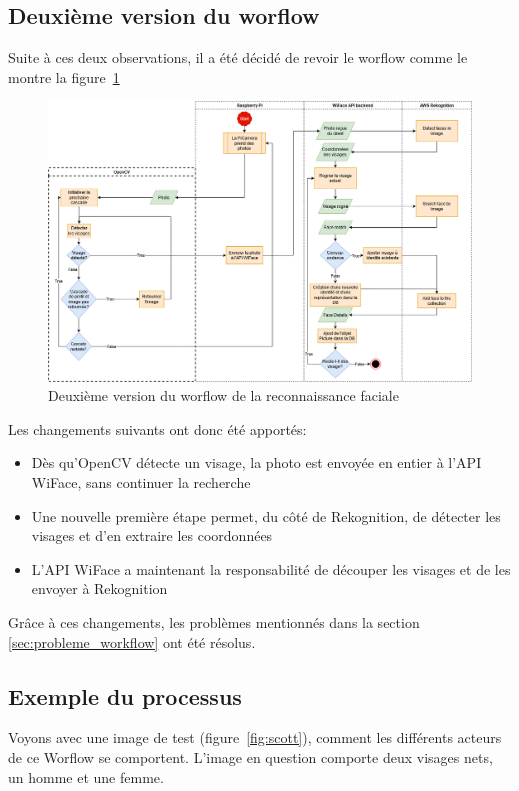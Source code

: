 \subsection{Deuxième version du worflow}
Suite à ces deux observations, il a été décidé de revoir le worflow comme le montre la figure~\ref{fig:worflow-reco2}

\clearpage
\newpage

\thispagestyle{empty}
\begin{landscape}
    \centering
\thispagestyle{empty}
\begin{figure}%
     \includegraphics[width=\linewidth]{images/facial_reco/flowchart_reco_v3.png}
     \caption{Deuxième version du worflow de la reconnaissance faciale}
     \label{fig:worflow-reco2}
\end{figure}
\end{landscape}

Les changements suivants ont donc été apportés:
\begin{itemize}
    \item Dès qu'OpenCV détecte un visage, la photo est envoyée en entier à l'API WiFace, sans continuer la recherche
    \item Une nouvelle première étape permet, du côté de Rekognition, de détecter les visages et d'en extraire les coordonnées
    \item L'API WiFace a maintenant la responsabilité de découper les visages et de les envoyer à Rekognition
\end{itemize}

Grâce à ces changements, les problèmes mentionnés dans la section \ref{sec:probleme_workflow} ont été résolus.
\subsection{Exemple du processus}
Voyons avec une image de test (figure~\ref{fig:scott}), comment les différents acteurs de ce Worflow se comportent.
L'image en question comporte deux visages nets, un homme et une femme.

